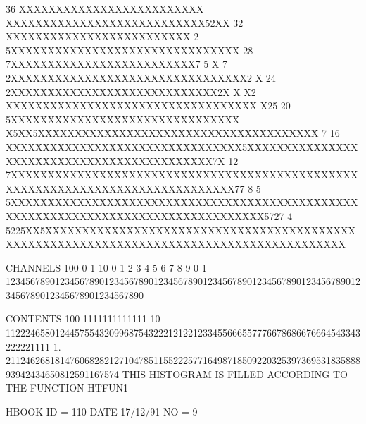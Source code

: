 \begin{Listing}
       36                          XXXXXXXXXXXXXXXXXXXXXXXXX           XXXXXXXXXXXXXXXXXXXXXXXXXXX52XX
       32                          XXXXXXXXXXXXXXXXXXXXXXXXX    2     5XXXXXXXXXXXXXXXXXXXXXXXXXXXXXXX
       28                         7XXXXXXXXXXXXXXXXXXXXXXXXX7 5 X 7  2XXXXXXXXXXXXXXXXXXXXXXXXXXXXXXXX2 X
       24                       2XXXXXXXXXXXXXXXXXXXXXXXXXXXX2X X X2 XXXXXXXXXXXXXXXXXXXXXXXXXXXXXXXXXX X25
       20                      5XXXXXXXXXXXXXXXXXXXXXXXXXXXXXXX X5XX5XXXXXXXXXXXXXXXXXXXXXXXXXXXXXXXXXXXXXX 7
       16                      XXXXXXXXXXXXXXXXXXXXXXXXXXXXXXXX5XXXXXXXXXXXXXXXXXXXXXXXXXXXXXXXXXXXXXXXXXXX7X
       12                     7XXXXXXXXXXXXXXXXXXXXXXXXXXXXXXXXXXXXXXXXXXXXXXXXXXXXXXXXXXXXXXXXXXXXXXXXXXXXXX77
        8                 5 5XXXXXXXXXXXXXXXXXXXXXXXXXXXXXXXXXXXXXXXXXXXXXXXXXXXXXXXXXXXXXXXXXXXXXXXXXXXXXXXXXX5727
        4            5225XX5XXXXXXXXXXXXXXXXXXXXXXXXXXXXXXXXXXXXXXXXXXXXXXXXXXXXXXXXXXXXXXXXXXXXXXXXXXXXXXXXXXXXXXXX
 
 CHANNELS 100   0                                                                                                  1   
           10   0        1         2         3         4         5         6         7         8         9         0   
            1   1234567890123456789012345678901234567890123456789012345678901234567890123456789012345678901234567890   
 
 CONTENTS 100                          1111111111111                                                                
           10                 112224658012445755432099687543222121221233455666557776678686676664543343222221111     
            1.       21124626818147606828212710478511552225771649871850922032539736953183588893942434650812591167574
\newpage
 THIS HISTOGRAM IS FILLED ACCORDING TO THE FUNCTION HTFUN1                       
 
 HBOOK     ID =       110                                        DATE  17/12/91              NO =   9
 

\end{Listing}
